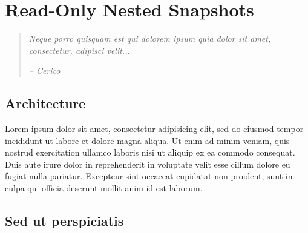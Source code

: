 
%
%
%


\chapter{Read-Only Nested Snapshots}
\label{ch:RONSProblem}

\begin{quotation}
  {\small\it Neque porro quisquam est qui dolorem ipsum quia dolor sit amet, consectetur, adipisci velit...}

{\small\it -- Cerico}
\end{quotation}




\section{Architecture}

Lorem ipsum dolor sit amet, consectetur adipisicing elit, sed do eiusmod tempor incididunt ut labore et dolore magna aliqua. Ut enim ad minim veniam, quis nostrud exercitation ullamco laboris nisi ut aliquip ex ea commodo consequat. Duis aute irure dolor in reprehenderit in voluptate velit esse cillum dolore eu fugiat nulla pariatur. Excepteur sint occaecat cupidatat non proident, sunt in culpa qui officia deserunt mollit anim id est laborum.


\section{Sed ut perspiciatis}

